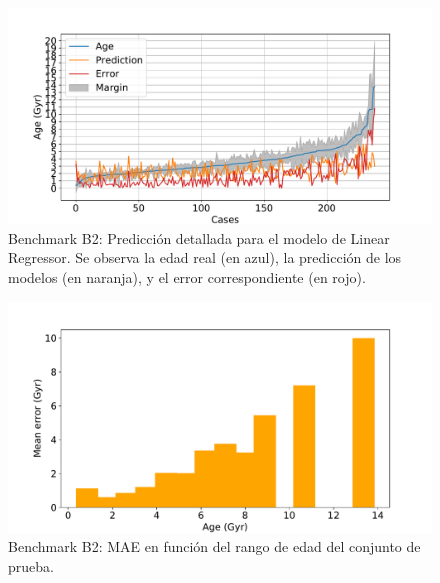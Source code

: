 \begin{figure}[H]
\begin{center}
 \includegraphics[width=0.8\linewidth]{Figuras/Experimentos/B_B2_lr_2.pdf}
\end{center}
\caption{Benchmark B2: Predicción detallada para el modelo de Linear Regressor. Se observa la edad real (en azul), la predicción de los modelos (en naranja), y el error correspondiente (en rojo).}
 \label{fig:benchB2_details_lr_2}
\end{figure}

\begin{figure}[H]
\begin{center}
 \includegraphics[width=0.8\linewidth]{Figuras/Experimentos/B_B2_lr_3.pdf}
\end{center}
\caption{Benchmark B2: MAE en función del rango de edad del conjunto de prueba.}
 \label{fig:benchB2_details_lr_3}
\end{figure}

